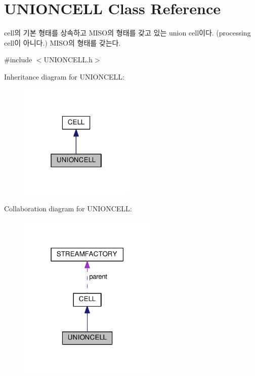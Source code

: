 \hypertarget{classUNIONCELL}{}\section{U\+N\+I\+O\+N\+C\+E\+L\+L Class Reference}
\label{classUNIONCELL}


cell의 기본 형태를 상속하고 M\+I\+S\+O의 형태를 갖고 있는 union cell이다. (processing cell이 아니다.) M\+I\+S\+O의 형태를 갖는다.  




{\ttfamily \#include $<$U\+N\+I\+O\+N\+C\+E\+L\+L.\+h$>$}



Inheritance diagram for U\+N\+I\+O\+N\+C\+E\+L\+L\+:\nopagebreak
\begin{figure}[H]
\begin{center}
\leavevmode
\includegraphics[width=154pt]{classUNIONCELL__inherit__graph}
\end{center}
\end{figure}


Collaboration diagram for U\+N\+I\+O\+N\+C\+E\+L\+L\+:\nopagebreak
\begin{figure}[H]
\begin{center}
\leavevmode
\includegraphics[width=187pt]{classUNIONCELL__coll__graph}
\end{center}
\end{figure}
